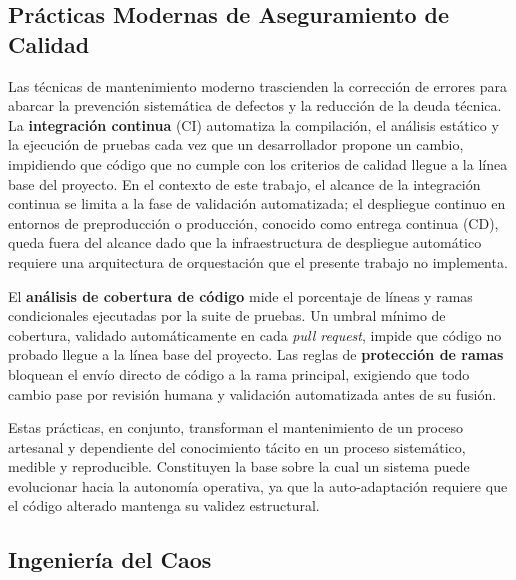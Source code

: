 \subsection{Pr\'{a}cticas Modernas de Aseguramiento de Calidad}

Las t\'{e}cnicas de mantenimiento moderno trascienden la correcci\'{o}n de errores para abarcar la prevenci\'{o}n sistem\'{a}tica de defectos y la reducci\'{o}n de la deuda t\'{e}cnica. La \textbf{integraci\'{o}n continua} (CI) automatiza la compilaci\'{o}n, el an\'{a}lisis est\'{a}tico y la ejecuci\'{o}n de pruebas cada vez que un desarrollador propone un cambio, impidiendo que c\'{o}digo que no cumple con los criterios de calidad llegue a la l\'{i}nea base del proyecto. En el contexto de este trabajo, el alcance de la integraci\'{o}n continua se limita a la fase de validaci\'{o}n automatizada; el despliegue continuo en entornos de preproducci\'{o}n o producci\'{o}n, conocido como entrega continua (CD), queda fuera del alcance dado que la infraestructura de despliegue autom\'{a}tico requiere una arquitectura de orquestaci\'{o}n que el presente trabajo no implementa.

El \textbf{an\'{a}lisis de cobertura de c\'{o}digo} mide el porcentaje de l\'{i}neas y ramas condicionales ejecutadas por la suite de pruebas. Un umbral m\'{i}nimo de cobertura, validado autom\'{a}ticamente en cada \textit{pull request}, impide que c\'{o}digo no probado llegue a la l\'{i}nea base del proyecto. Las reglas de \textbf{protecci\'{o}n de ramas} bloquean el env\'{i}o directo de c\'{o}digo a la rama principal, exigiendo que todo cambio pase por revisi\'{o}n humana y validaci\'{o}n automatizada antes de su fusi\'{o}n.

Estas pr\'{a}cticas, en conjunto, transforman el mantenimiento de un proceso artesanal y dependiente del conocimiento t\'{a}cito en un proceso sistem\'{a}tico, medible y reproducible. Constituyen la base sobre la cual un sistema puede evolucionar hacia la autonom\'{i}a operativa, ya que la auto-adaptaci\'{o}n requiere que el c\'{o}digo alterado mantenga su validez estructural.

\subsection{Ingenier\'{i}a del Caos}
\label{sec:ingenieria-caos}

